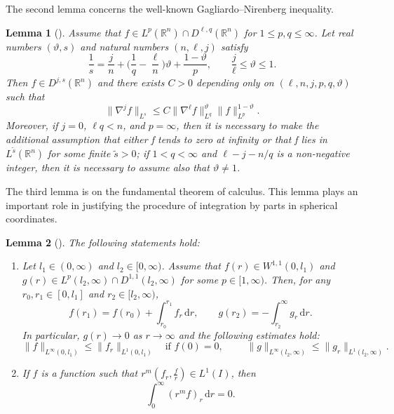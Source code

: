 \documentclass[11pt,reqno]{amsart}
\newtheorem{lem}{Lemma}[section]
\numberwithin{rk}{section}
\numberwithin{prop}{section}
\numberwithin{mydef}{section}
\numberwithin{lem}{section}
\numberwithin{equation}{section}
\numberwithin{thm}{section}
\begin{document}
The second lemma concerns the well-known Gagliardo--Nirenberg inequality.  

\begin{lem}[\cite{ln}]\label{GN-ineq}
Assume that  $f\in L^{p}(\mathbb{R}^n)\cap D^{\ell,q}(\mathbb{R}^n)$ for   $1 \leq p,  q \leq \infty$.  Let real numbers $(\vartheta,s)$ and  natural numbers $(n,\ell,j)$ satisfy
\begin{equation*}
\frac{1}{{s}} = \frac{j}{n} + \Big( \frac{1}{q} - \frac{\ell}{n} \Big) \vartheta + \frac{1 - \vartheta}{p}, \qquad \frac{j}{\ell} \leq \vartheta \leq 1.
\end{equation*}
Then $f\in D^{j,{s}}(\mathbb{R}^n)$ and  there exists $C>0$ depending only on $(\ell,n,j,p,q,\vartheta)$ such that
\begin{equation*} 
\| \nabla^{j} f \|_{L^{{s}}} \leq C \| \nabla^{\ell} f \|_{L^{q}}^{\vartheta} \| f \|_{L^{p}}^{1 - \vartheta}.
\end{equation*}
Moreover, if $j = 0$, $\ell q < n$, and $p = \infty$, then it is necessary to make the additional assumption that either f tends to zero at infinity or that f lies in $L^{\tilde{s}}(\mathbb{R}^n)$ for some finite $\tilde{s} > 0${\rm;} if $1 < q < \infty$ and $\ell -j -n/q$ is a non-negative integer, then it is necessary to assume also that $\vartheta \neq 1$.
\end{lem}

The third lemma is on the fundamental theorem of calculus. This lemma plays an important role in justifying the procedure of integration by parts in spherical coordinates.
\begin{lem}[\cite{realrudin}]\label{calculus}
The following statements hold{\rm:}
\begin{enumerate}
\item[{\rm(i)}] Let $l_1\in (0,\infty)$ and $l_2\in [0,\infty)$. Assume that $f(r)\in W^{1,1}(0,l_1)$ and $g(r)\in L^p(l_2,\infty)\cap D^{1,1}(l_2,\infty)$ for some $p\in [1,\infty)$.  Then, for any $r_0,r_1\in [0,l_1]$ and $r_2\in [l_2,\infty)$,
\begin{equation}\label{newton}
f(r_1)=f(r_0)+\int_{r_0}^{r_1} f_r\,\mathrm{d}r,\qquad g(r_2)=-\int_{r_2}^{\infty} g_r\,\mathrm{d}r.
\end{equation}
In particular, $g(r)\to 0$ as $r\to \infty$ and the following estimates hold{\rm:}
\begin{equation}\label{newton2}
\|f\|_{L^\infty(0,l_1)}\leq \|f_r\|_{L^1(0,l_1)} \quad \text{if $f(0)=0$},\qquad\,\, \|g\|_{L^\infty(l_2,\infty)}\leq \|g_r\|_{L^1(l_2,\infty)}.
\end{equation}
\item[{\rm(ii)}] If $f$ is a function such that $r^m(f_r,\frac{f}{r}) \in L^1(I)$, then
\begin{equation}
\int_0^\infty (r^m f)_r\,\mathrm{d}r=0.
\end{equation}
\end{enumerate}
\end{lem}
\end{document}
